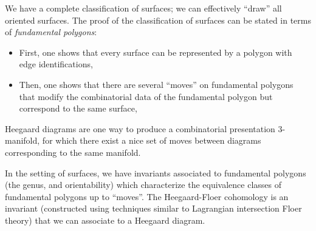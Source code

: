 

We have a complete classification of surfaces; we can effectively ``draw'' all oriented surfaces. The proof of the classification of surfaces can be stated in terms of \emph{fundamental polygons}:
\begin{itemize}
    \item First, one shows that every surface can be represented by a polygon with edge identifications, 
    \item Then, one shows that there are several ``moves'' on fundamental polygons that modify the combinatorial data of the fundamental polygon but correspond to the same surface,
\end{itemize} 


Heegaard diagrams are one way to produce a combinatorial presentation 3-manifold, for which there exist a nice set of moves between diagrams corresponding to the same manifold.

In the setting of surfaces, we have invariants associated to fundamental polygons (the genus, and orientability) which characterize the equivalence classes of fundamental polygons up to ``moves''.
The Heegaard-Floer cohomology is an invariant (constructed using techniques similar to Lagrangian intersection Floer theory) that we can associate to a Heegaard diagram.





